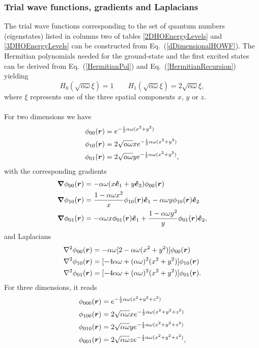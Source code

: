 \subsubsection{Trial wave functions, gradients and Laplacians}
The trial wave functions corresponding to the set of quantum numbers (eigenstates) listed in columns two of tables \ref{2DHOEnergyLevels} and \ref{3DHOEnergyLevels} can be constructed from Eq.~(\ref{dDimensionalHOWF}). The Hermitian polynomials needed for the ground-state and the first excited states can be derived from Eq.~(\ref{HermitianPol}) and Eq.~(\ref{HermitianRecursion}) yielding
\begin{equation}
H_0(\sqrt{\alpha \omega} \xi) = 1 \qquad H_1(\sqrt{\alpha \omega} \xi) = 2 \sqrt{\alpha \omega} \xi, 
\end{equation}
where $\xi$ represents one of the three spatial components $x$, $y$ or $z$.\\
\\
For two dimensions we have
\begin{align}
 \phi_{00}(\boldsymbol{r}) &= e^{-\frac{1}{2}\alpha\omega(x^2 + y^2)}\\
 \phi_{10}(\boldsymbol{r}) &= 2\sqrt{\alpha \omega} x e^{-\frac{1}{2}\alpha\omega(x^2 + y^2)} \\
 \phi_{01}(\boldsymbol{r}) &= 2\sqrt{\alpha \omega} y e^{-\frac{1}{2}\alpha\omega(x^2 + y^2)},
\end{align}
with the corresponding gradients 
\begin{align}
 \boldsymbol{\nabla}\phi_{00}(\boldsymbol{r}) &= -\alpha \omega (x \mbox{\boldmath$\hat{e}$\unboldmath}_1 + y \mbox{\boldmath$\hat{e}$\unboldmath}_2) \phi_{00}(\boldsymbol{r})\\
 \boldsymbol{\nabla}\phi_{10}(\boldsymbol{r}) &= \frac{1 - \alpha \omega x^2}{x} \phi_{10}(\boldsymbol{r}) \mbox{\boldmath$\hat{e}$\unboldmath}_1 - \alpha \omega y \phi_{10}(\boldsymbol{r}) \mbox{\boldmath$\hat{e}$\unboldmath}_2\\
 \boldsymbol{\nabla}\phi_{01}(\boldsymbol{r}) &= - \alpha \omega x \phi_{01}(\boldsymbol{r}) \mbox{\boldmath$\hat{e}$\unboldmath}_1 + \frac{1 - \alpha \omega y^2}{y} \phi_{01}(\boldsymbol{r}) \mbox{\boldmath$\hat{e}$\unboldmath}_2,
\end{align}
and Laplacians
\begin{align}
 \nabla^2 \phi_{00}(\boldsymbol{r}) &= -\alpha \omega[2 - \alpha\omega(x^2 + y^2)] \phi_{00}(\boldsymbol{r})\\
 \nabla^2 \phi_{10}(\boldsymbol{r}) &= [-4 \alpha \omega + (\alpha \omega)^2 (x^2 + y^2)] \phi_{10}(\boldsymbol{r}) \\
 \nabla^2 \phi_{01}(\boldsymbol{r}) &= [-4 \alpha \omega + (\alpha \omega)^2 (x^2 + y^2)] \phi_{01}(\boldsymbol{r}).
\end{align}
For three dimensions, it reads
\begin{align}
 \phi_{000}(\boldsymbol{r}) &= e^{-\frac{1}{2}\alpha\omega(x^2 + y^2 + z^2)}\\
 \phi_{100}(\boldsymbol{r}) &= 2\sqrt{\alpha \omega} x e^{-\frac{1}{2}\alpha\omega(x^2 + y^2 + z^2)} \\
 \phi_{010}(\boldsymbol{r}) &= 2\sqrt{\alpha \omega} y e^{-\frac{1}{2}\alpha\omega(x^2 + y^2 + z^2)} \\
 \phi_{001}(\boldsymbol{r}) &= 2\sqrt{\alpha \omega} z e^{-\frac{1}{2}\alpha\omega(x^2 + y^2 + z^2)},
\end{align}
